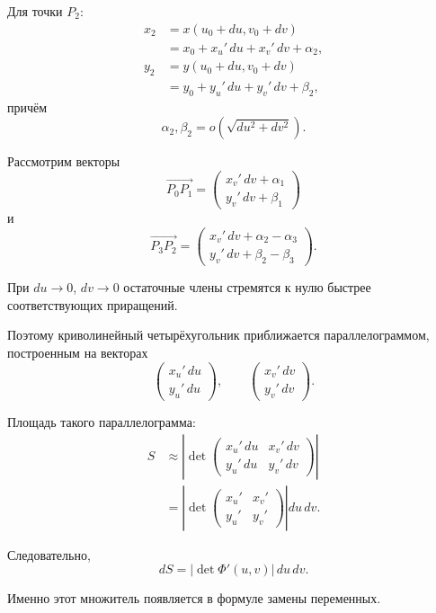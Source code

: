 \documentclass[12pt,a4paper]{article}
\begin{document}
Для точки $P_2$:
\[
\begin{aligned}
x_2&=x(u_0+du,v_0+dv)\\
&=x_0+x_u'\,du+x_v'\,dv+\alpha_2,\\
y_2&=y(u_0+du,v_0+dv)\\
&=y_0+y_u'\,du+y_v'\,dv+\beta_2,
\end{aligned}
\]
причём
\[
\alpha_2,\beta_2
=o\left(\sqrt{du^2+dv^2}\right).
\]

Рассмотрим векторы
\[
\overrightarrow{P_0P_1}
=
\begin{pmatrix}
x_v'\,dv+\alpha_1\\
y_v'\,dv+\beta_1
\end{pmatrix}
\]
и
\[
\overrightarrow{P_3P_2}
=
\begin{pmatrix}
x_v'\,dv+\alpha_2-\alpha_3\\
y_v'\,dv+\beta_2-\beta_3
\end{pmatrix}.
\]

При $du\to0$, $dv\to0$ остаточные члены стремятся к нулю быстрее соответствующих приращений.

Поэтому криволинейный четырёхугольник приближается параллелограммом, построенным на векторах
\[
\begin{pmatrix}
x_u'\,du\\
y_u'\,du
\end{pmatrix},
\qquad
\begin{pmatrix}
x_v'\,dv\\
y_v'\,dv
\end{pmatrix}.
\]

Площадь такого параллелограмма:
\[
\begin{aligned}
S
&\approx
\left|
\det
\begin{pmatrix}
x_u'\,du & x_v'\,dv\\
y_u'\,du & y_v'\,dv
\end{pmatrix}
\right|\\
&=
\left|
\det
\begin{pmatrix}
x_u'&x_v'\\
y_u'&y_v'
\end{pmatrix}
\right|du\,dv.
\end{aligned}
\]

Следовательно,
\[
\boxed{
dS=|\det\Phi'(u,v)|\,du\,dv.
}
\]

Именно этот множитель появляется в формуле замены переменных.
\end{document}
